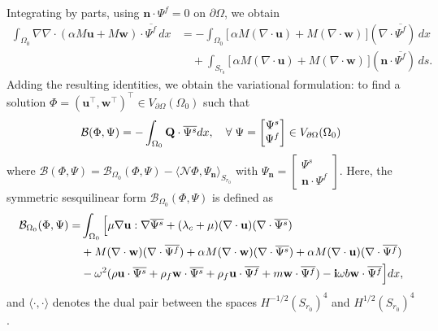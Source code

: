 \documentclass[11pt]{article}
\newcommand{\pa}{\partial}
\newcommand{\Om}{\Omega}
\newcommand{\la}{\lambda}
\newcommand{\bs}{\boldsymbol}
\begin{document}
Integrating by parts, using $\bs{n}\cdot\Psi^f = 0$ on $\pa\Om$, we obtain
\begin{equation*}
\begin{aligned}
\int_{\Om_0} \nabla\nabla\cdot(\alpha M\mathbf{u}+M\mathbf{w})\cdot\overline{\Psi^f}\,dx
&= -\int_{\Om_0} \bigl[\,\alpha M(\nabla\cdot\mathbf{u})
+ M(\nabla\cdot\mathbf{w})\,\bigr](\nabla\cdot\overline{\Psi^f})\,dx \\
&\quad + \int_{S_{r_0}} \bigl[\,\alpha M(\nabla\cdot\mathbf{u})
+ M(\nabla\cdot\mathbf{w})\,\bigr](\bs{n}\cdot\overline{\Psi^f})\,ds .
\end{aligned}
\end{equation*}
Adding the resulting identities, we obtain the variational formulation: to find a solution
 $\Phi=(\mathbf{u}^{\top},\mathbf{w}^{\top})^{\top}\in V_{\pa\Om}(\Om_0)$ such that
\begin{equation}\label{scattering0}
\mathcal{B}(\Phi,\Psi)=-\int_{\Om_0}{\bf Q}\cdot \overline{\Psi^s}dx,\quad \forall\;\Psi=\begin{bmatrix}
\Psi^s   \\
\Psi^f 
\end{bmatrix} \in V_{\pa \Om}(\Om_0)
\end{equation}
where $\mathcal{B}(\Phi,\Psi)=\mathcal{B}_{\Om_0}(\Phi,\Psi)-\langle \mathcal{N}\Phi,\Psi_{\bs{n}}
\rangle_{S_{r_0}}$ with $\Psi_{\bs{n}}=\begin{bmatrix}
\Psi^s   \\
\bs{n}\cdot \Psi^f 
\end{bmatrix}$.
Here, the symmetric sesquilinear form $\mathcal{B}_{\Om_0}(\Phi,\Psi)$ is defined as
\begin{equation}\label{B_Om0}
\begin{aligned}
\mathcal{B}_{\Om_0}(\Phi,\Psi)=&\int_{\Om_0}\Big[\mu\nabla\mathbf{u}:\nabla\overline{\Psi^s} 
+(\la_c+\mu)(\nabla\cdot \mathbf{u})(\nabla\cdot\overline{\Psi^s})
\\
&+ M(\nabla\cdot \mathbf{w})(\nabla\cdot\overline{\Psi^f})+\alpha M(\nabla\cdot \mathbf{w})
(\nabla\cdot\overline{\Psi^s})+\alpha M(\nabla\cdot\mathbf{u})(\nabla\cdot\overline{\Psi^f})
\\
&-\omega^2(\rho\mathbf{u}\cdot\overline{\Psi^s} +\rho_f \mathbf{w}\cdot\overline{\Psi^s}
+\rho_f\mathbf{u}\cdot\overline{\Psi^f} +m\mathbf{w}\cdot\overline{\Psi^f})
-{\bf{i}}\omega b\mathbf{w}\cdot\overline{\Psi^f} \Big]dx,
\end{aligned}
\end{equation}
and $\langle\cdot,\cdot\rangle$ denotes the dual pair between the spaces $H^{-1/2}(S_{r_0})^4$ 
and $H^{1/2}(S_{r_0})^4$.
\end{document}
